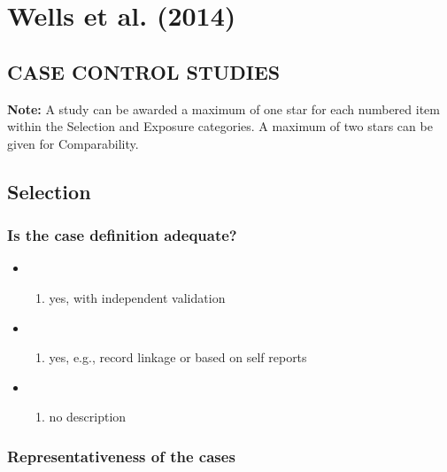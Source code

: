\documentclass[
  doc, a4paper]{apa7}
\providecommand{\tightlist}{%
  \setlength{\itemsep}{0pt}\setlength{\parskip}{0pt}}
\begin{document}
\section{Wells et al. (2014)}\label{wellsnewcastleottawascalenos2014}

\subsection{\texorpdfstring{\textbf{CASE CONTROL STUDIES}}{CASE CONTROL STUDIES}}\label{case-control-studies}

\textbf{Note:} A study can be awarded a maximum of one star for each numbered item within the Selection and Exposure categories. A maximum of two stars can be given for Comparability.

\subsection{Selection}\label{selection}

\subsubsection{Is the case definition adequate?}\label{is-the-case-definition-adequate}

\begin{itemize}
\tightlist
\item
  \begin{enumerate}
  \def\labelenumi{\alph{enumi})}
  \tightlist
  \item
    yes, with independent validation
  \end{enumerate}
\item
  \begin{enumerate}
  \def\labelenumi{\alph{enumi})}
  \setcounter{enumi}{1}
  \tightlist
  \item
    yes, e.g., record linkage or based on self reports
  \end{enumerate}
\item
  \begin{enumerate}
  \def\labelenumi{\alph{enumi})}
  \setcounter{enumi}{2}
  \tightlist
  \item
    no description
  \end{enumerate}
\end{itemize}

\subsubsection{Representativeness of the cases}\label{representativeness-of-the-cases}
\end{document}
